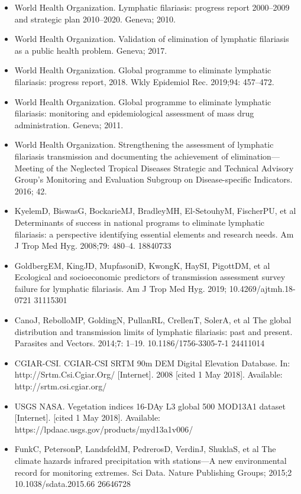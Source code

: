 \documentclass[11pt,a4paper]{article}
\begin{document}
\begin{itemize}
\item World Health Organization. Lymphatic filariasis: progress report 2000–2009 and strategic plan 2010–2020. Geneva; 2010.
\item World Health Organization. Validation of elimination of lymphatic filariasis as a public health problem. Geneva; 2017.
\item World Health Organization. Global programme to eliminate lymphatic filariasis: progress report, 2018. Wkly Epidemiol Rec. 2019;94: 457–472.
\item World Health Organization. Global programme to eliminate lymphatic filariasis: monitoring and epidemiological assessment of mass drug administration. Geneva; 2011.
\item World Health Organization. Strengthening the assessment of lymphatic filariasis transmission and documenting the achievement of elimination—Meeting of the Neglected Tropical Diseases Strategic and Technical Advisory Group’s Monitoring and Evaluation Subgroup on Disease-specific Indicators. 2016; 42.
\item KyelemD, BiswasG, BockarieMJ, BradleyMH, El-SetouhyM, FischerPU, et al Determinants of success in national programs to eliminate lymphatic filariasis: a perspective identifying essential elements and research needs. Am J Trop Med Hyg. 2008;79: 480–4. 18840733
\item GoldbergEM, KingJD, MupfasoniD, KwongK, HaySI, PigottDM, et al Ecological and socioeconomic predictors of transmission assessment survey failure for lymphatic filariasis. Am J Trop Med Hyg. 2019; 10.4269/ajtmh.18-0721 31115301
\item CanoJ, RebolloMP, GoldingN, PullanRL, CrellenT, SolerA, et al The global distribution and transmission limits of lymphatic filariasis: past and present. Parasites and Vectors. 2014;7: 1–19. 10.1186/1756-3305-7-1 24411014
\item CGIAR-CSI. CGIAR-CSI SRTM 90m DEM Digital Elevation Database. In: http://Srtm.Csi.Cgiar.Org/ [Internet]. 2008 [cited 1 May 2018]. Available: http://srtm.csi.cgiar.org/
\item USGS NASA. Vegetation indices 16-DAy L3 global 500 MOD13A1 dataset [Internet]. [cited 1 May 2018]. Available: https://lpdaac.usgs.gov/products/myd13a1v006/
\item FunkC, PetersonP, LandsfeldM, PedrerosD, VerdinJ, ShuklaS, et al The climate hazards infrared precipitation with stations—A new environmental record for monitoring extremes. Sci Data. Nature Publishing Groups; 2015;2 10.1038/sdata.2015.66 26646728

\end{itemize}
\end{document}
